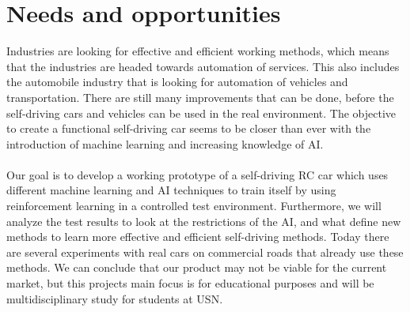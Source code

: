 \documentclass{article}
\begin{document}
\section{Needs and opportunities} 

\titleSpace






Industries are looking for effective and efficient working methods, which means that the industries are headed towards automation of services. This also includes the automobile industry that is looking for automation of vehicles and transportation. There are still many improvements that can be done, before the self-driving cars and vehicles can be used in the real environment. The objective to create a functional self-driving car seems to be closer than ever with the introduction of machine learning and increasing knowledge of AI.
\paragraph*{}
Our goal is to develop a working prototype of a self-driving RC car which uses different machine learning and AI techniques to train itself by using reinforcement learning in a controlled test environment. Furthermore, we will analyze the test results to look at the restrictions of the AI, and what define new methods to learn more effective and efficient self-driving methods. Today there are several experiments with real cars on commercial roads that already use these methods. 
We can conclude that our product may not be viable for the current market, but this projects main focus is for educational purposes and will be multidisciplinary study for students at USN.

  
\end{document}

